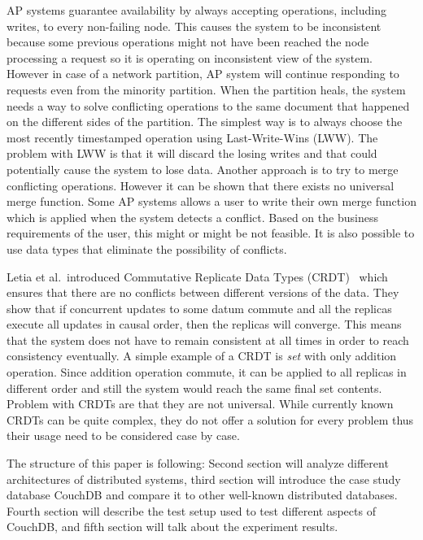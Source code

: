 AP systems guarantee availability by always accepting operations, including
writes, to every non-failing node. This causes the system to be inconsistent
because some previous operations might not have been reached the node
processing a request so it is operating on inconsistent view of the system.
However in case of a network partition, AP system will continue responding to
requests even from the minority partition. When the partition heals, the system
needs a way to solve conflicting operations to the same document that happened
on the different sides of the partition. The simplest way is to always choose the most recently timestamped
operation using Last-Write-Wins (LWW). The problem with LWW is that it will
discard the losing writes and that could potentially cause the system to lose
data.  Another approach is to try to merge conflicting operations. However it
can be shown that there exists no universal merge function. Some AP systems allows a user to write their own merge function which
is applied when the system detects a conflict.  Based on the business
requirements of the user, this might or might be not feasible. It is also
possible to use data types that eliminate the possibility of conflicts.

Letia et al.\ introduced Commutative Replicate Data Types
(CRDT)~\cite{letia2009crdts} which ensures that there are no conflicts between
different versions of the data. They show that if concurrent updates to some
datum commute and all the replicas execute all updates in causal order, then the
replicas will converge. This means that the system does not have to remain
consistent at all times in order to reach consistency eventually. A simple
example of a CRDT is \emph{set} with only addition operation. Since addition
operation commute, it can be applied to all replicas in different order and
still the system would reach the same final set contents. Problem with CRDTs
are that they are not universal. While currently known CRDTs can be quite
complex, they do not offer a solution for every problem thus their usage need
to be considered case by case.

The structure of this paper is following: Second section will analyze different
architectures of distributed systems, third section will introduce the case
study database CouchDB and compare it to other well-known distributed databases.
Fourth section will describe the test setup used to test different aspects of
CouchDB, and fifth section will talk about the experiment results.
